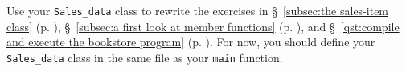 %
%
\begin{question}\label{qst:rewrite exercises with sales-data class}
Use your \verb|Sales_data| class to rewrite the exercises in \S~\ref{subsec:the sales-item class} (p. \pageref{subsec:the sales-item class}),
\S~\ref{subsec:a first look at member functions} (p. \pageref{subsec:a first look at member functions}), and \S~\ref{qst:compile and execute the bookstore program} (p. \pageref{qst:compile and execute the bookstore program}). For now, you should define
your \verb|Sales_data| class in the same file as your \verb|main| function.
\end{question}
